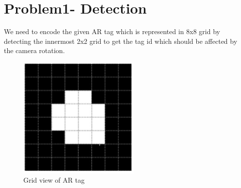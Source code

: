 \documentclass[12pt]{article}
\begin{document}


\section{Problem1- Detection}
We need to encode the given AR tag which is represented in 8x8 grid by detecting the innermost 2x2 grid to get the tag id which should be affected by the camera rotation.
\begin{figure}[h]
    \centering
    \includegraphics[width=6cm]{artaggrid}
    \caption{Grid view of AR tag}
    \label{fig:artaggrid}
\end{figure}
\end{document}
